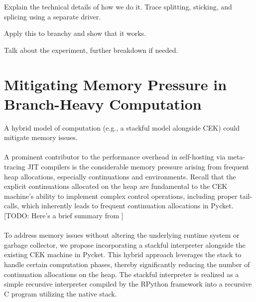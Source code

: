     \begin{paragraph-here}
      Explain the technical details of how we do it. Trace splitting, sticking, and splicing using a separate driver.
    \end{paragraph-here}

    \begin{show-experiment}
      Apply this to branchy and show that it works.
    \end{show-experiment}

    \begin{paragraph-here}
      Talk about the experiment, further breakdown if needed.
    \end{paragraph-here}

	\section[\texorpdfstring{Mitigating Memory Pressure in Branch-Heavy Computation}{CEK + Stackful Model}]{Mitigating Memory Pressure in Branch-Heavy Computation}
    \label{section:stackful}

		\begin{mainpoint}
			A hybrid model of computation (e.g., a stackful model alongside CEK) could mitigate memory issues.
		\end{mainpoint}

    \paragraph{}%
      A prominent contributor to the performance overhead in self-hosting via meta-tracing JIT compilers is the considerable memory pressure arising from frequent heap allocations, especially continuations and environments. Recall that the explicit continuations allocated on the heap are fundamental to the CEK machine's ability to implement complex control operations, including proper tail-calls, which inherently leads to frequent continuation allocations in Pycket. [TODO: Here's a brief summary from ]

    \paragraph{}%
      To address memory issues without altering the underlying runtime system or garbage collector, we propose incorporating a stackful interpreter alongside the existing CEK machine in Pycket. This hybrid approach leverages the stack to handle certain computation phases, thereby significantly reducing the number of continuation allocations on the heap. The stackful interpreter is realized as a simple recursive interpreter compiled by the RPython framework into a recursive C program utilizing the native stack.

